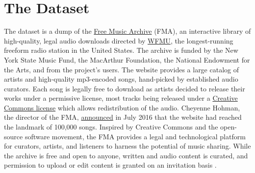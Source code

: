 \documentclass{article}
\begin{document}


\section{The Dataset} %




The dataset is a dump of the \href{https://freemusicarchive.org/}{Free Music Archive} (FMA), an interactive library of high-quality, legal audio downloads directed by \href{https://wfmu.org/}{WFMU}, the longest-running freeform radio station in the United States.
The archive is funded by the New York State Music Fund, the MacArthur Foundation, the National Endowment for the Arts, and from the project's users.
The website provides a large catalog of artists and high-quality mp3-encoded songs, hand-picked by established audio curators. Each song is legally free to download as artists decided to release their works under a permissive license, most tracks being released under a \href{https://creativecommons.org/}{Creative Commons license} which allows redistribution of the audio. Cheyenne Hohman, the director of the FMA, \href{http://freemusicarchive.org/member/cheyenne_h/blog/100000_SONGS}{announced} in July 2016 that the website had reached the landmark of 100,000 songs.
Inspired by Creative Commons and the open-source software movement, the FMA provides a legal and technological platform for curators, artists, and listeners to harness the potential of music sharing. While the archive is free and open to anyone, written and audio content is curated, and permission to upload or edit content is granted on an invitation basis \cite{art:MossFMA}.
\end{document}
